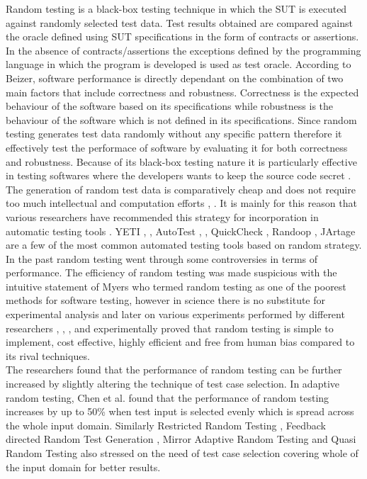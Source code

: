 Random testing is a black-box testing technique in which the SUT is executed against randomly selected test data. Test results obtained are compared against the oracle defined using SUT specifications in the form of contracts or assertions. In the absence of contracts/assertions the exceptions defined by the programming language in which the program is developed is used as test oracle. According to Beizer, \cite{Beizer1990} software performance is directly dependant on the combination of two main factors that include correctness and robustness. Correctness is the expected behaviour of the software based on its specifications while robustness is the behaviour of the software which is not defined in its specifications. Since random testing generates test data randomly without any specific pattern therefore it effectively test the performace of software by evaluating it for both correctness and robustness. Because of its black-box testing nature it is particularly effective in testing softwares where the developers wants to keep the source code secret \cite{Chen2010}. The generation of random test data is comparatively cheap and does not require too much intellectual and computation efforts \cite{Ciupa2009}, \cite{Ciupa2008}. It is mainly for this reason that various researchers have recommended this strategy for incorporation in automatic testing tools \cite{Ciupa2008a}. YETI \cite{Oriol2010a}, \cite{Oriol2010}, AutoTest \cite{Leitner2007}, \cite{Ciupa2007}, QuickCheck \cite{Claessen2000}, Randoop \cite{Pacheco2007}, JArtage \cite{Oriat2004} are a few of the most common automated testing tools based on random strategy.\\
In the past random testing went through some controversies in terms of performance. The efficiency of random testing was made suspicious with the intuitive statement of Myers \cite{Myers2004} who termed random testing as one of the poorest methods for software testing, however in science there is no substitute for experimental analysis and later on various experiments performed by different researchers \cite{Ciupa2007}, \cite{Duran1981}, \cite{Duran1984}, \cite{Hamlet1994} and \cite{Ntafos2001}  experimentally proved that random testing is simple to implement, cost effective, highly efficient and free from human bias compared to its rival techniques. \\

The researchers found that the performance of random testing can be further increased by slightly altering the technique of test case selection. In adaptive random testing, Chen et al.  \cite{Chen2008} found that the performance of random testing increases by up to 50\% when test input is selected evenly which is spread across the whole input domain. Similarly Restricted Random Testing \cite{Chan2002}, Feedback directed Random Test Generation \cite{Pacheco2007a}, Mirror Adaptive Random Testing \cite{Chen2003} and Quasi Random Testing \cite{Chen2005} also stressed on the need of test case selection covering whole of the input domain for better results. \\


